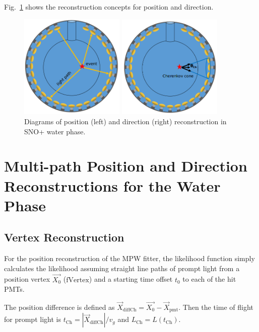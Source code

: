 Fig.~\ref{mpwdiagram} shows the reconstruction concepts for position and direction.
\begin{figure}[htbp]
	\centering
	\begin{minipage}[t]{0.45\textwidth}
		\centering
		\includegraphics[width=5cm]{mpwDiagram.png}
	\end{minipage}
	\begin{minipage}[t]{0.4\textwidth}
		\centering
		\includegraphics[width=5cm]{mpwDiagram2.png}
	\end{minipage}
	\caption{Diagrams of position (left) and direction (right) reconstruction in SNO+ water phase.}
	\label{mpwdiagram}
\end{figure}
	
\section{Multi-path Position and Direction Reconstructions for the Water Phase}

\subsection{Vertex Reconstruction}
For the position reconstruction of the MPW fitter, the likelihood function simply calculates the likelihood assuming straight line paths of prompt light from a position vertex $\vec{X_0}$ ($\mathrm{fVertex}$) and a starting time offset $t_0$ to each of the hit PMTs. 

The position difference is defined as $\vec{X}_{{\mathrm{diffCh}}} = \vec{X_0}-\vec{X}_{\mathrm{pmt}}$. Then the time of flight for prompt light is $t_{\mathrm{Ch}}=|\vec{X}_{{\mathrm{diffCh}}}|/v_g$ and $L_{\mathrm{Ch}}=L(t_{\mathrm{Ch}})$.

